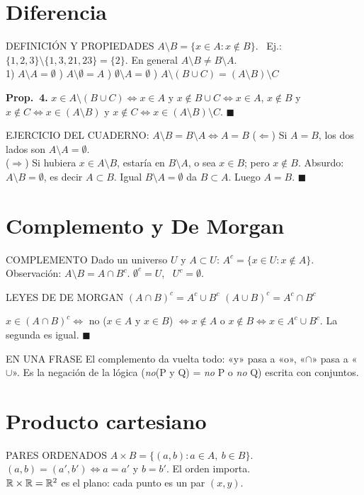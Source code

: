 \section{Diferencia}
\apuntes
\begin{sello}{DEFINICIÓN Y PROPIEDADES}
$A\setminus B=\{x\in A: x\notin B\}$. \ Ej.: $\{1,2,3\}\setminus\{1,3,21,23\}=\{2\}$. En general $A\setminus B\neq B\setminus A$.\\[3pt]
1) $A\setminus A=\emptyset$ ) $A\setminus\emptyset=A$ ) $\emptyset\setminus A=\emptyset$ ) $A\setminus(B\cup C)=(A\setminus B)\setminus C$
\end{sello}
\agregado
\begin{demo}
\textbf{Prop.\ 4.} $x\in A\setminus(B\cup C)\iff x\in A$ y $x\notin B\cup C\iff x\in A$, $x\notin B$ y $x\notin C\iff x\in(A\setminus B)$ y $x\notin C\iff x\in(A\setminus B)\setminus C$. $\blacksquare$
\end{demo}
\begin{sello}{EJERCICIO DEL CUADERNO: $A\setminus B=B\setminus A\iff A=B$}
($\Leftarrow$) Si $A=B$, los dos lados son $A\setminus A=\emptyset$.\\[2pt]
($\Rightarrow$) Si hubiera $x\in A\setminus B$, estaría en $B\setminus A$, o sea $x\in B$; pero $x\notin B$. Absurdo: $A\setminus B=\emptyset$, es decir $A\subset B$. Igual $B\setminus A=\emptyset$ da $B\subset A$. Luego $A=B$. $\blacksquare$
\end{sello}

\section{Complemento y De Morgan}
\apuntes
\begin{sello}{COMPLEMENTO}
Dado un universo $U$ y $A\subset U$: $A^c=\{x\in U:x\notin A\}$.\\[3pt]
Observación: $A\setminus B=A\cap B^c$. \quad $\emptyset^c=U$, \ $U^c=\emptyset$.
\end{sello}
\begin{sello}{LEYES DE DE MORGAN}
$(A\cap B)^c=A^c\cup B^c$ \qquad $(A\cup B)^c=A^c\cap B^c$
\end{sello}
\agregado
\begin{demo}
$x\in(A\cap B)^c\iff$ no ($x\in A$ y $x\in B$) $\iff x\notin A$ o $x\notin B\iff x\in A^c\cup B^c$. La segunda es igual. $\blacksquare$
\end{demo}
\begin{tip}{EN UNA FRASE}
El complemento da vuelta todo: «y» pasa a «o», «$\cap$» pasa a «$\cup$». Es la negación de la lógica (\emph{no}(P y Q) = \emph{no} P o \emph{no} Q) escrita con conjuntos.
\end{tip}

\section{Producto cartesiano}
\agregado
\begin{sello}{PARES ORDENADOS}
$A\times B=\{(a,b): a\in A,\ b\in B\}$. \ $(a,b)=(a',b')\iff a=a'$ y $b=b'$. El orden importa.\\[2pt]
$\mathbb{R}\times\mathbb{R}=\mathbb{R}^2$ es el plano: cada punto es un par $(x,y)$.
\end{sello}
